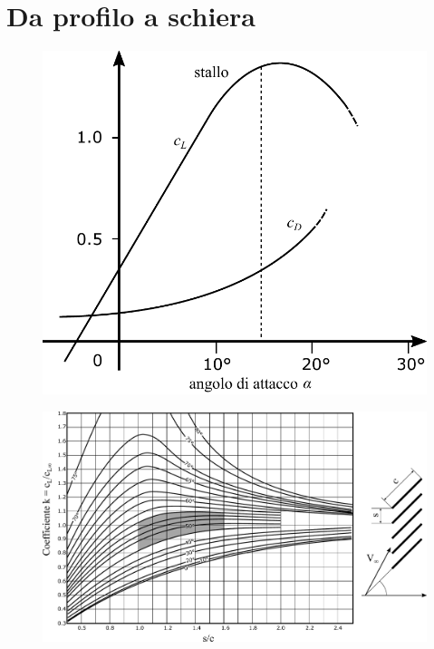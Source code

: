 \section{Da profilo a schiera} 
\begin{figure}
\centering
\begin{minipage}{.3\textwidth}
  \centering
  \includegraphics[width=.95\linewidth]{fig/cdcl.pdf}
  \label{fig:cdcl}
\end{minipage}%
\begin{minipage}{.7\textwidth}
  \centering
  \includegraphics[width=.95\linewidth]{fig/EffSchiera.pdf}
  \label{fig:EffSchiera}
\end{minipage}
\end{figure}

